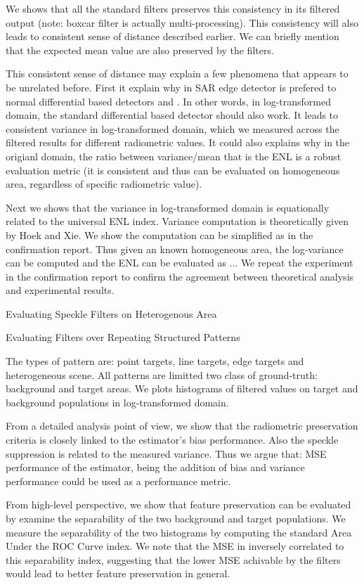 We shows that all the standard filters preserves this consistency in its filtered output (note: boxcar filter is actually multi-processing). 
This consistency will also leads to consistent sense of distance described earlier.
We can briefly mention that the expected mean value are also preserved by the filters.

This consistent sense of distance may explain a few phenomena that appears to be unrelated before.
First it explain why in SAR edge detector is prefered to normal differential based detectors  and . In other words, in log-transformed domain, the standard differential based detector should also work.
It leads to consistent variance in log-transformed domain, which we measured across the filtered results for different radiometric values.
It could also explains why in the origianl domain, the ratio between variance/mean that is the ENL is a robust evaluation metric (it is consistent and thus can be evaluated on homogeneous area, regardless of specific radiometric value).

Next we shows that the variance in log-transformed domain is equationally related to the universal ENL index. 
Variance computation is theoretically given by Hoek and Xie.
We show the computation can be simplified as in the confirmation report.
Thus given an known homogeneous area, the log-variance can be computed and the ENL can be evaluated as ...
We repeat the experiment in the confirmation report to confirm the agreement between theoretical analysis and experimental results. 

Evaluating Speckle Filters on Heterogenous Area

Evaluating Filters over Repeating Structured Patterns


The types of pattern are: point targets, line targets, edge targets and heterogeneous scene. 
All patterns are limitted two class of ground-truth: background and target areas.
We plots histograms of filtered values on target and background populations in log-transformed domain.

From a detailed analysis point of view, we show that the radiometric preservation criteria is closely linked to the estimator's bias performance.
Also the speckle suppression is related to the measured variance.
Thus we argue that: MSE performance of the estimator, being the addition of bias and variance performance could be used as a performance metric.

From high-level perspective, we show that feature preservation can be evaluated by examine the separability of the two background and target populations.
We measure the separability of the two histograms by computing the standard Area Under the ROC Curve index.
We note that the MSE in inversely correlated to this separability index, suggesting that the lower MSE achivable by the filters would lead to better feature preservation in general.

